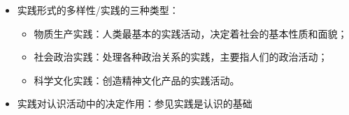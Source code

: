 \documentclass[12pt,openany]{ctexbook}
\newcommand{\zhemph}[1]{{\kaishu #1}}
\begin{document}
\begin{itemize}
\begin{itemize}
  \item 实践的主体、客体和中介是实践活动的三项基本要素，三者的有机统一构成实践的基本结构：
\begin{itemize}
  \item 实践主体：在实践活动中，具有一定的主体能力、从事现实社会实践活动的人；
  \item 实践客体：实践活动所指向的对象；
  \item 实践中介：各种形式的工具、手段以及运用、操作这些工具、手段的程序和方法。
\end{itemize}
  \item 实践的主体和客体相互作用的关系，包括实践关系、认识关系和价值关系，其中实践关系是最根本的关系。
  \item 实践的主体、客体和中介是不断变化发展的，因而实践的基本结构也是历史地变化发展的，这种变化主要表现为主体客体化和客体主体化的双向运动。二者作为人类实践活动两个不可分割的方面，互为前提、互为媒介，人类就是通过这种运动形式不断解决着现实世界的矛盾。
\end{itemize}
  \item 实践形式的多样性/实践的三种类型：
\begin{itemize}
  \item 物质生产实践：人类最基本的实践活动，决定着社会的基本性质和面貌；
  \item 社会政治实践：处理各种政治关系的实践，主要指人们的政治活动；
  \item 科学文化实践：创造精神文化产品的实践活动。
\end{itemize}
  \item 实践对认识活动中的决定作用：参见\zhemph{实践是认识的基础}
\end{itemize}
\end{document}
